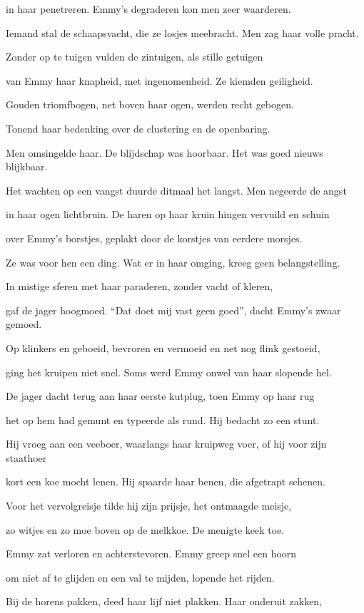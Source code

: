 in haar penetreren.
Emmy’s degraderen
kon men zeer waarderen.

Iemand stal de schaapsvacht,
die ze losjes meebracht.
Men zag haar volle pracht.

Zonder op te tuigen
vulden de zintuigen,
als stille getuigen

van Emmy haar knapheid,
met ingenomenheid.
Ze kiemden geiligheid.

Gouden triomfbogen,
net boven haar ogen,
werden recht gebogen.

Tonend haar bedenking
over de clustering
en de openbaring.

Men omsingelde haar.
De blijdschap was hoorbaar.
Het was goed nieuws blijkbaar.

Het wachten op een vangst
duurde ditmaal het langst.
Men negeerde de angst

in haar ogen lichtbruin.
De haren op haar kruin
hingen vervuild en schuin

over Emmy’s borstjes,
geplakt door de korstjes
van eerdere morsjes.

Ze was voor hen een ding.
Wat er in haar omging,
kreeg geen belangstelling.

In mistige sferen
met haar paraderen,
zonder vacht of kleren,

gaf de jager hoogmoed.
“Dat doet mij vast geen goed”,
dacht Emmy’s zwaar gemoed.

Op klinkers en geboeid,
bevroren en vermoeid
en net nog flink gestoeid,

ging het kruipen niet snel.
Soms werd Emmy onwel
van haar slopende hel.

De jager dacht terug
aan haar eerste kutplug,
toen Emmy op haar rug

het op hem had gemunt
en typeerde als rund.
Hij bedacht zo een stunt.

Hij vroeg aan een veeboer,
waarlangs haar kruipweg voer,
of hij voor zijn staathoer

kort een koe mocht lenen.
Hij spaarde haar benen,
die afgetrapt schenen.

Voor het vervolgreisje
tilde hij zijn prijsje,
het ontmaagde meisje,

zo witjes en zo moe
boven op de melkkoe.
De menigte keek toe.

Emmy zat verloren
en achterstevoren.
Emmy greep snel een hoorn

om niet af te glijden
en een val te mijden,
lopende het rijden.

Bij de horens pakken,
deed haar lijf niet plakken.
Haar onderuit zakken,

